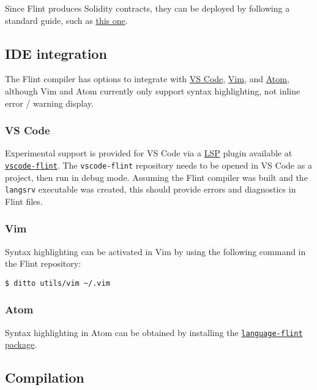 Since Flint produces Solidity contracts, they can be deployed by following a standard guide, such as \href{https://medium.com/mercuryprotocol/dev-highlights-of-this-week-cb33e58c745f}{this one}.

\subsection{IDE integration}
\label{sec:appendix-b-ide-integration}

The Flint compiler has options to integrate with \hyperref[sec:appendix-b-vs-code]{VS Code}, \hyperref[sec:appendix-b-vim]{Vim}, and \hyperref[sec:appendix-b-atom]{Atom}, although Vim and Atom currently only support syntax highlighting, not inline error / warning display.

\subsubsection{VS Code}
\label{sec:appendix-b-vs-code}

Experimental support is provided for VS Code via a \href{https://langserver.org/}{LSP} plugin available at \href{https://github.com/flintrocks/vscode-flint}{\texttt{vscode-flint}}. The \texttt{vscode-flint} repository needs to be opened in VS Code as a project, then run in debug mode. Assuming the Flint compiler was built and the \texttt{langsrv} executable was created, this should provide errors and diagnostics in Flint files.

\subsubsection{Vim}
\label{sec:appendix-b-vim}

Syntax highlighting can be activated in Vim by using the following command in the Flint repository:

\begin{verbatim}
$ ditto utils/vim ~/.vim
\end{verbatim}

\subsubsection{Atom}
\label{sec:appendix-b-atom}

Syntax highlighting in Atom can be obtained by installing the \href{https://atom.io/packages/language-flint}{\texttt{language-flint} package}.

\subsection{Compilation}
\label{sec:appendix-b-compilation}

